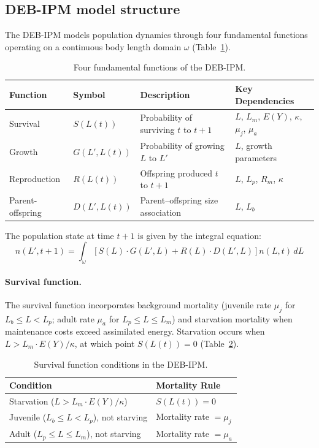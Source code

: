 \documentclass[11pt]{article}
\begin{document}
\subsection{DEB-IPM model structure}

The DEB-IPM models population dynamics through four fundamental functions operating on a continuous body length domain $\omega$ (Table~\ref{tab:functions}).

\begin{table}[ht]
\centering
\caption{Four fundamental functions of the DEB-IPM.}
\label{tab:functions}
\begin{tabular}{llll}
\toprule
Function & Symbol & Description & Key Dependencies \\
\midrule
Survival & $S(L(t))$ & Probability of surviving $t$ to $t+1$ & $L$, $L_m$, $E(Y)$, $\kappa$, $\mu_j$, $\mu_a$ \\
Growth & $G(L', L(t))$ & Probability of growing $L$ to $L'$ & $L$, growth parameters \\
Reproduction & $R(L(t))$ & Offspring produced $t$ to $t+1$ & $L$, $L_p$, $R_m$, $\kappa$ \\
Parent-offspring & $D(L', L(t))$ & Parent--offspring size association & $L$, $L_b$ \\
\bottomrule
\end{tabular}
\end{table}

The population state at time $t+1$ is given by the integral equation:
\begin{equation}
n(L', t+1) = \int_{\omega} \left[ S(L) \cdot G(L', L) + R(L) \cdot D(L', L) \right] n(L, t) \, dL
\end{equation}

\paragraph{Survival function.} The survival function incorporates background mortality (juvenile rate $\mu_j$ for $L_b \leq L < L_p$; adult rate $\mu_a$ for $L_p \leq L \leq L_m$) and starvation mortality when maintenance costs exceed assimilated energy. Starvation occurs when $L > L_m \cdot E(Y) / \kappa$, at which point $S(L(t)) = 0$ (Table~\ref{tab:survival}).

\begin{table}[ht]
\centering
\caption{Survival function conditions in the DEB-IPM.}
\label{tab:survival}
\begin{tabular}{ll}
\toprule
Condition & Mortality Rule \\
\midrule
Starvation ($L > L_m \cdot E(Y) / \kappa$) & $S(L(t)) = 0$ \\
Juvenile ($L_b \leq L < L_p$), not starving & Mortality rate $= \mu_j$ \\
Adult ($L_p \leq L \leq L_m$), not starving & Mortality rate $= \mu_a$ \\
\bottomrule
\end{tabular}
\end{table}
\end{document}
